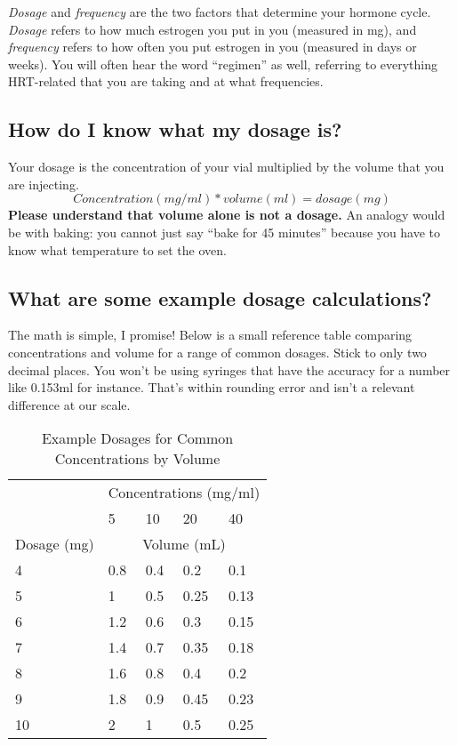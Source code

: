 \documentclass{article}
\begin{document}
\textit{Dosage} and \textit{frequency} are the two factors that determine your hormone cycle. \textit{Dosage} refers to how much estrogen you put in you (measured in mg), and \textit{frequency} refers to how often you put estrogen in you (measured in days or weeks). You will often hear the word “regimen” as well, referring to everything HRT-related that you are taking and at what frequencies.

\subsection{How do I know what my dosage is?}

Your dosage is the concentration of your vial multiplied by the volume that you are injecting. \[Concentration (mg/ml) * volume (ml) = dosage (mg)\] \textbf{Please understand that volume alone is not a dosage.} An analogy would be with baking: you cannot just say “bake for 45 minutes” because you have to know what temperature to set the oven.

\subsection{What are some example dosage calculations?}

The math is simple, I promise! Below is a small reference table comparing concentrations and volume for a range of common dosages. Stick to only two decimal places. You won’t be using syringes that have the accuracy for a number like 0.153ml for instance. That’s within rounding error and isn’t a relevant difference at our scale.

\begin{table}[]
\centering
\caption{Example Dosages for Common Concentrations by Volume}
\label{tab:concentrations}
\begin{tabular}{@{}lllll@{}}
    \toprule
    \multicolumn{1}{c}{} & \multicolumn{4}{c}{Concentrations (mg/ml)} \\
    \cmidrule(rl){2-5}
            & 5    & 10  & 20 & 40    \\
            \cmidrule(rl){2-5}
Dosage (mg) & \multicolumn{4}{c}{Volume (mL)}  \\
    \cmidrule(r){1-1} \cmidrule(lr){2-5} 
4        & 0.8  & 0.4 & 0.2  & 0.1      \\
5        & 1    & 0.5 & 0.25 & 0.13   \\
6        & 1.2  & 0.6   & 0.3  & 0.15     \\
7        & 1.4  & 0.7 & 0.35  & 0.18  \\
8        & 1.6  & 0.8   & 0.4  & 0.2    \\
9        & 1.8  & 0.9 & 0.45  & 0.23 \\
10       & 2    & 1   & 0.5  & 0.25   \\
    \bottomrule
\end{tabular}
\end{table}
\end{document}
